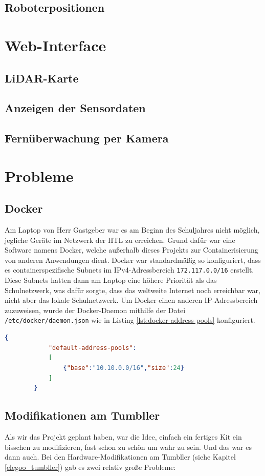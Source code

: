 \documentclass[12pt]{article}
\begin{document}
	\subsection{Roboterpositionen}
	\section{Web-Interface}
	\subsection{LiDAR-Karte}
	\subsection{Anzeigen der Sensordaten}
	\subsection{Fernüberwachung per Kamera}
	\section{Probleme}
	\subsection{Docker}
	Am Laptop von Herr Gastgeber war es am Beginn des Schuljahres nicht möglich,
	jegliche Geräte im Netzwerk der HTL zu erreichen.
	Grund dafür war eine Software namens Docker,
	welche außerhalb dieses Projekts zur Containerisierung von anderen Anwendungen dient.
	Docker war standardmäßig so konfiguriert,
	dass es containerspezifische Subnets im IPv4-Adressbereich \allowbreak\texttt{172.117.0.0/16} erstellt.
	Diese Subnets hatten dann am Laptop eine höhere Priorität als das Schulnetzwerk,
	was dafür sorgte,
	dass das weltweite Internet noch erreichbar war, 
	nicht aber das lokale Schulnetzwerk.
	Um Docker einen anderen IP-Adressbereich zuzuweisen,
	wurde der Docker-Daemon mithilfe der Datei \texttt{/etc/docker/daemon.json}
	wie in Listing \ref{lst:docker-address-pools} konfiguriert.
	\begin{lstlisting}[language=json,gobble=4,
		label=lst:docker-address-pools,caption=Konfiguration für den Docker-Daemon]
		{
  			"default-address-pools":
  			[
    			{"base":"10.10.0.0/16","size":24}
  			]
		}
	\end{lstlisting}

	\subsection{Modifikationen am Tumbller}
	Als wir das Projekt geplant haben,
	war die Idee,
	einfach ein fertiges Kit ein bisschen zu modifizieren,
	fast schon zu schön um wahr zu sein.
	Und das war es dann auch.
	Bei den Hardware-Modifikationen am Tumbller (siehe Kapitel \ref{elegoo_tumbller}) gab es zwei relativ große Probleme:
\end{document}

